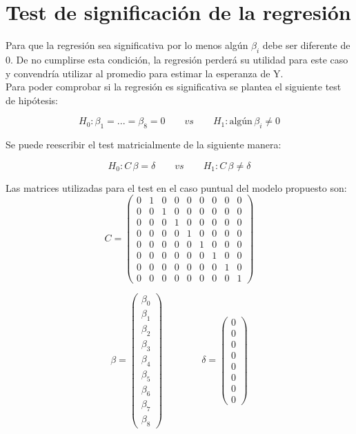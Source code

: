 \documentclass{article}
\begin{document}
\section{Test de significación de la regresión}

\noindent
Para que la regresión sea significativa por lo menos algún \(\beta_i\) debe ser diferente de 0. De no cumplirse esta condición, la regresión perderá su utilidad para este caso y convendría utilizar al promedio para estimar la esperanza de Y.\\

\noindent
Para poder comprobar si la regresión es significativa se plantea el siguiente test de hipótesis:

$$H_0: \beta_1 = ... = \beta_8 = 0\qquad vs\qquad H_1: \text{algún}\, \beta_i \neq 0$$

\noindent
Se puede reescribir el test matricialmente de la siguiente manera:

$$H_0: C\, \beta = \delta \qquad vs\qquad H_1: C\, \beta \neq \delta$$

\noindent
Las matrices utilizadas para el test en el caso puntual del modelo propuesto son:\\

$$
C = \begin{pmatrix}
0 & 1 & 0 & 0 & 0 & 0 & 0 & 0 & 0\\
0 & 0 & 1 & 0 & 0 & 0 & 0 & 0 & 0\\
0 & 0 & 0 & 1 & 0 & 0 & 0 & 0 & 0\\
0 & 0 & 0 & 0 & 1 & 0 & 0 & 0 & 0\\
0 & 0 & 0 & 0 & 0 & 1 & 0 & 0 & 0\\
0 & 0 & 0 & 0 & 0 & 0 & 1 & 0 & 0\\
0 & 0 & 0 & 0 & 0 & 0 & 0 & 1 & 0\\
0 & 0 & 0 & 0 & 0 & 0 & 0 & 0 & 1
\end{pmatrix}
$$

$$
\beta = \begin{pmatrix}
\beta_0\\
\beta_1\\
\beta_2\\
\beta_3\\
\beta_4\\
\beta_5\\
\beta_6\\
\beta_7\\
\beta_8
\end{pmatrix}
\qquad  \qquad
\delta = \begin{pmatrix}
0\\
0\\
0\\
0\\
0\\
0\\
0\\
0
\end{pmatrix}
$$\\
\end{document}
